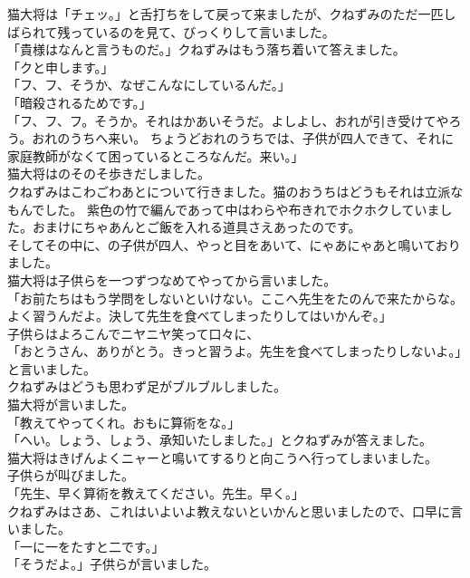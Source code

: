 \documentclass[
a4paper,
10pt,
book]
{tarticle}
\begin{document}
\indent 猫大将は「チェッ。」と舌打ちをして戻って来ましたが、クねずみのただ一匹しばられて残っているのを見て、びっくりして言いました。\\
「貴様はなんと言うものだ。」クねずみはもう落ち着いて答えました。\\
「クと申します。」\\
「フ、フ、そうか、なぜこんなにしているんだ。」\\
「暗殺されるためです。」\\
「フ、フ、フ。そうか。それはかあいそうだ。よしよし、おれが引き受けてやろう。おれのうちへ来い。
ちょうどおれのうちでは、子供が四人できて、それに家庭教師がなくて困っているところなんだ。来い。」\\
\indent 猫大将はのそのそ歩きだしました。\\
\indent クねずみはこわごわあとについて行きました。猫のおうちはどうもそれは立派なもんでした。
紫色の竹で編んであって中はわらや布きれでホクホクしていました。おまけにちゃあんとご飯を入れる道具さえあったのです。\\
\indent そしてその中に、の子供が四人、やっと目をあいて、にゃあにゃあと鳴いておりました。\\
\indent 猫大将は子供らを一つずつなめてやってから言いました。\\
「お前たちはもう学問をしないといけない。ここへ先生をたのんで来たからな。よく習うんだよ。決して先生を食べてしまったりしてはいかんぞ。」\\
\indent 子供らはよろこんでニヤニヤ笑って口々に、\\
「おとうさん、ありがとう。きっと習うよ。先生を食べてしまったりしないよ。」と言いました。\\
\indent クねずみはどうも思わず足がブルブルしました。\\
\indent 猫大将が言いました。\\
「教えてやってくれ。おもに算術をな。」\\
「へい。しょう、しょう、承知いたしました。」とクねずみが答えました。\\
\indent 猫大将はきげんよくニャーと鳴いてするりと向こうへ行ってしまいました。\\
\indent 子供らが叫びました。\\
「先生、早く算術を教えてください。先生。早く。」\\
\indent クねずみはさあ、これはいよいよ教えないといかんと思いましたので、口早に言いました。\\
「一に一をたすと二です。」\\
「そうだよ。」子供らが言いました。\\
\end{document}

